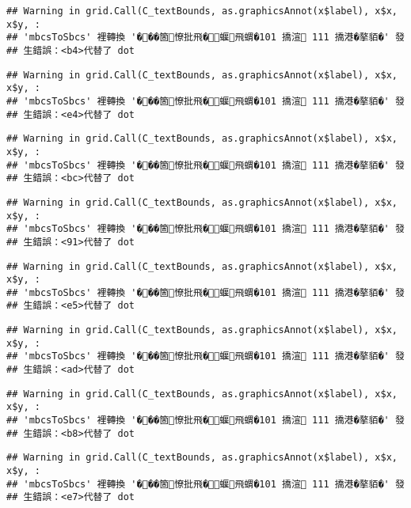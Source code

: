 \documentclass[
]{article}
\begin{document}
\begin{verbatim}
## Warning in grid.Call(C_textBounds, as.graphicsAnnot(x$label), x$x, x$y, :
## 'mbcsToSbcs' 裡轉換 '���箇憭批飛�蝘飛蝟�101 撟渲 111 撟港�摮貊�' 發
## 生錯誤：<b4>代替了 dot
\end{verbatim}

\begin{verbatim}
## Warning in grid.Call(C_textBounds, as.graphicsAnnot(x$label), x$x, x$y, :
## 'mbcsToSbcs' 裡轉換 '���箇憭批飛�蝘飛蝟�101 撟渲 111 撟港�摮貊�' 發
## 生錯誤：<e4>代替了 dot
\end{verbatim}

\begin{verbatim}
## Warning in grid.Call(C_textBounds, as.graphicsAnnot(x$label), x$x, x$y, :
## 'mbcsToSbcs' 裡轉換 '���箇憭批飛�蝘飛蝟�101 撟渲 111 撟港�摮貊�' 發
## 生錯誤：<bc>代替了 dot
\end{verbatim}

\begin{verbatim}
## Warning in grid.Call(C_textBounds, as.graphicsAnnot(x$label), x$x, x$y, :
## 'mbcsToSbcs' 裡轉換 '���箇憭批飛�蝘飛蝟�101 撟渲 111 撟港�摮貊�' 發
## 生錯誤：<91>代替了 dot
\end{verbatim}

\begin{verbatim}
## Warning in grid.Call(C_textBounds, as.graphicsAnnot(x$label), x$x, x$y, :
## 'mbcsToSbcs' 裡轉換 '���箇憭批飛�蝘飛蝟�101 撟渲 111 撟港�摮貊�' 發
## 生錯誤：<e5>代替了 dot
\end{verbatim}

\begin{verbatim}
## Warning in grid.Call(C_textBounds, as.graphicsAnnot(x$label), x$x, x$y, :
## 'mbcsToSbcs' 裡轉換 '���箇憭批飛�蝘飛蝟�101 撟渲 111 撟港�摮貊�' 發
## 生錯誤：<ad>代替了 dot
\end{verbatim}

\begin{verbatim}
## Warning in grid.Call(C_textBounds, as.graphicsAnnot(x$label), x$x, x$y, :
## 'mbcsToSbcs' 裡轉換 '���箇憭批飛�蝘飛蝟�101 撟渲 111 撟港�摮貊�' 發
## 生錯誤：<b8>代替了 dot
\end{verbatim}

\begin{verbatim}
## Warning in grid.Call(C_textBounds, as.graphicsAnnot(x$label), x$x, x$y, :
## 'mbcsToSbcs' 裡轉換 '���箇憭批飛�蝘飛蝟�101 撟渲 111 撟港�摮貊�' 發
## 生錯誤：<e7>代替了 dot
\end{verbatim}
\end{document}
